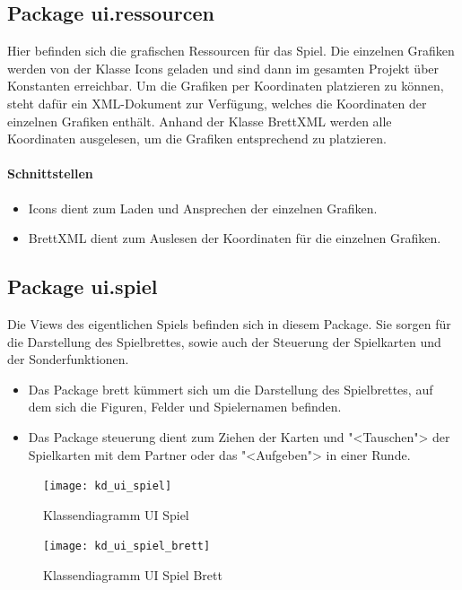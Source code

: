 \documentclass[12pt,halfparskip]{scrartcl}
\begin{document}
\subsection{Package ui.ressourcen}

Hier befinden sich die grafischen Ressourcen für das Spiel. Die einzelnen Grafiken werden von der Klasse Icons geladen und sind dann im gesamten Projekt über Konstanten erreichbar. Um die Grafiken per Koordinaten platzieren zu können, steht dafür ein XML-Dokument zur Verfügung, welches die Koordinaten der einzelnen Grafiken enthält. Anhand der Klasse BrettXML werden alle Koordinaten ausgelesen, um die Grafiken entsprechend zu platzieren.

\paragraph{Schnittstellen}
\begin{itemize}
	\item Icons dient zum Laden und Ansprechen der einzelnen Grafiken.
	\item BrettXML dient zum Auslesen der Koordinaten für die einzelnen Grafiken.
\end{itemize}

\subsection{Package ui.spiel}

Die Views des eigentlichen Spiels befinden sich in diesem Package. Sie sorgen für die Darstellung des Spielbrettes, sowie auch der Steuerung der Spielkarten und der Sonderfunktionen.

\begin{itemize}
	\item Das Package brett kümmert sich um die Darstellung des Spielbrettes, auf dem sich die Figuren, Felder und Spielernamen befinden.
	\item Das Package steuerung dient zum Ziehen der Karten und "<Tauschen"> der Spielkarten mit dem Partner oder das "<Aufgeben"> in einer Runde.
\end{itemize}

\begin{figure}[h]
	\centering
	\texttt{[image: kd\_ui\_spiel]}
	\caption{Klassendiagramm UI Spiel}
	\label{fig:kd_ui_spiel}
\end{figure}

\begin{figure}[h]
	\centering
	\texttt{[image: kd\_ui\_spiel\_brett]}
	\caption{Klassendiagramm UI Spiel Brett}
	\label{fig:kd_ui_spiel_brett}
\end{figure}
\end{document}
